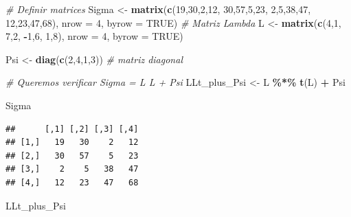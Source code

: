 \documentclass[
]{book}
\newenvironment{Shaded}{\begin{snugshade}}{\end{snugshade}}
\newcommand{\AttributeTok}[1]{\textcolor[rgb]{0.13,0.29,0.53}{#1}}
\newcommand{\CommentTok}[1]{\textcolor[rgb]{0.56,0.35,0.01}{\textit{#1}}}
\newcommand{\ConstantTok}[1]{\textcolor[rgb]{0.56,0.35,0.01}{#1}}
\newcommand{\DecValTok}[1]{\textcolor[rgb]{0.00,0.00,0.81}{#1}}
\newcommand{\FunctionTok}[1]{\textcolor[rgb]{0.13,0.29,0.53}{\textbf{#1}}}
\newcommand{\NormalTok}[1]{#1}
\newcommand{\OtherTok}[1]{\textcolor[rgb]{0.56,0.35,0.01}{#1}}
\newcommand{\SpecialCharTok}[1]{\textcolor[rgb]{0.81,0.36,0.00}{\textbf{#1}}}
\begin{document}
\begin{Shaded}
\begin{Highlighting}[]
\CommentTok{\# Definir matrices}
\NormalTok{Sigma }\OtherTok{\textless{}{-}} \FunctionTok{matrix}\NormalTok{(}\FunctionTok{c}\NormalTok{(}\DecValTok{19}\NormalTok{,}\DecValTok{30}\NormalTok{,}\DecValTok{2}\NormalTok{,}\DecValTok{12}\NormalTok{,}
                  \DecValTok{30}\NormalTok{,}\DecValTok{57}\NormalTok{,}\DecValTok{5}\NormalTok{,}\DecValTok{23}\NormalTok{,}
                  \DecValTok{2}\NormalTok{,}\DecValTok{5}\NormalTok{,}\DecValTok{38}\NormalTok{,}\DecValTok{47}\NormalTok{,}
                  \DecValTok{12}\NormalTok{,}\DecValTok{23}\NormalTok{,}\DecValTok{47}\NormalTok{,}\DecValTok{68}\NormalTok{), }
                \AttributeTok{nrow =} \DecValTok{4}\NormalTok{, }\AttributeTok{byrow =} \ConstantTok{TRUE}\NormalTok{)}
\CommentTok{\# Matriz Lambda}
\NormalTok{L }\OtherTok{\textless{}{-}} \FunctionTok{matrix}\NormalTok{(}\FunctionTok{c}\NormalTok{(}\DecValTok{4}\NormalTok{,}\DecValTok{1}\NormalTok{,}
              \DecValTok{7}\NormalTok{,}\DecValTok{2}\NormalTok{,}
              \SpecialCharTok{{-}}\DecValTok{1}\NormalTok{,}\DecValTok{6}\NormalTok{,}
              \DecValTok{1}\NormalTok{,}\DecValTok{8}\NormalTok{),}
            \AttributeTok{nrow =} \DecValTok{4}\NormalTok{, }\AttributeTok{byrow =} \ConstantTok{TRUE}\NormalTok{)}

\NormalTok{Psi }\OtherTok{\textless{}{-}} \FunctionTok{diag}\NormalTok{(}\FunctionTok{c}\NormalTok{(}\DecValTok{2}\NormalTok{,}\DecValTok{4}\NormalTok{,}\DecValTok{1}\NormalTok{,}\DecValTok{3}\NormalTok{))  }\CommentTok{\# matriz diagonal}

\CommentTok{\# Queremos verificar Sigma = L L\textquotesingle{} + Psi}
\NormalTok{LLt\_plus\_Psi }\OtherTok{\textless{}{-}}\NormalTok{ L }\SpecialCharTok{\%*\%} \FunctionTok{t}\NormalTok{(L) }\SpecialCharTok{+}\NormalTok{ Psi}

\NormalTok{Sigma}
\end{Highlighting}
\end{Shaded}

\begin{verbatim}
##      [,1] [,2] [,3] [,4]
## [1,]   19   30    2   12
## [2,]   30   57    5   23
## [3,]    2    5   38   47
## [4,]   12   23   47   68
\end{verbatim}

\begin{Shaded}
\begin{Highlighting}[]
\NormalTok{LLt\_plus\_Psi}
\end{Highlighting}
\end{Shaded}
\end{document}
